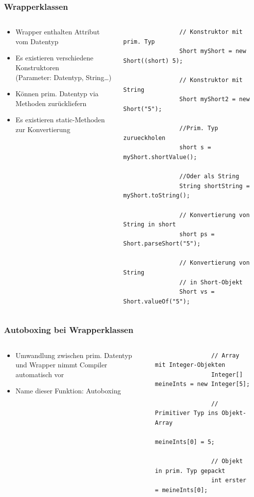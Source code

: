 \begin{frame}[fragile]
	\frametitle{Wrapperklassen}
	\begin{columns}
		\begin{column}{0.5\textwidth}
			\small
			\begin{itemize}
			  \item Wrapper enthalten Attribut vom Datentyp
			  \item Es existieren verschiedene Konstruktoren\\
			  (Parameter: Datentyp, String\ldots)
			  \item K\"onnen prim. Datentyp via Methoden
			  zur\"uckliefern
			  \item Es existieren static-Methoden zur Konvertierung
			\end{itemize}
		\end{column}
		\begin{column}{0.5\textwidth}
			\begin{lstlisting}
				// Konstruktor mit prim. Typ
				Short myShort = new Short((short) 5);
				
				// Konstruktor mit String
				Short myShort2 = new Short("5");
				
				//Prim. Typ zurueckholen
				short s = myShort.shortValue();
				
				//Oder als String
				String shortString = myShort.toString();
				
				// Konvertierung von String in short
				short ps = Short.parseShort("5");
				
				// Konvertierung von String 
				// in Short-Objekt
				Short vs = Short.valueOf("5");
			\end{lstlisting}
		\end{column}
	\end{columns}
\end{frame} 

\begin{frame}[fragile]
	\frametitle{Autoboxing bei Wrapperklassen}
	\begin{columns}
		\begin{column}{0.5\textwidth}
			\small
			\begin{itemize}
			  \item Umwandlung zwischen prim. Datentyp und 
			  Wrapper nimmt Compiler automatisch vor
			  \item Name dieser Funktion: Autoboxing
			\end{itemize}
		\end{column}
		\begin{column}{0.5\textwidth}
			\begin{lstlisting}
				// Array mit Integer-Objekten
				Integer[] meineInts = new Integer[5];
				
				// Primitiver Typ ins Objekt-Array
				meineInts[0] = 5;
				
				// Objekt in prim. Typ gepackt
				int erster = meineInts[0];
			\end{lstlisting}
		\end{column}
	\end{columns}
\end{frame}

